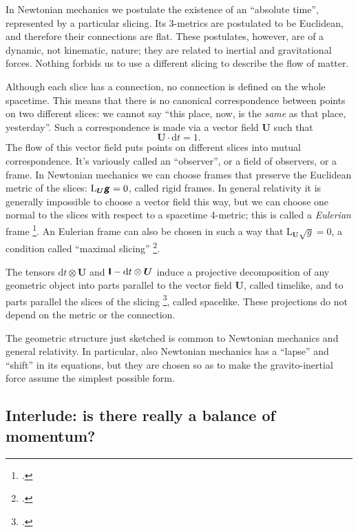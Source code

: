 \documentclass[\ifafour a4paper,12pt,\else a5paper,10pt,\fi%
onecolumn,oneside,article,%
british%
]{memoir}
\theoremstyle{remark}
\theoremstyle{innote}
\newcommand*{\mathte}[1]{\textbf{\textit{\textsf{#1}}}}
\newcommand*{\citep}{\footcites}
\newcommand*{\di}{\mathrm{d}}%
\renewcommand*{\|}[1][]{\nonscript\,#1\vert\nonscript\;\mathopen{}}
\newcommand*{\sect}{\S}%
\newcommand*{\Li}{\mathrm{L}}
\newcommand*{\yrr}{M}
\newcommand*{\yr}{\bm{\yrr}}
\newcommand*{\ycc}{u}
\newcommand*{\yc}{\bm{\ycc}}
\newcommand*{\yFF}{U}
\newcommand*{\yF}{\bm{\yFF}}
\newcommand*{\ygg}{g}
\newcommand*{\yg}{\mathte{\ygg}}
\newcommand*{\ygv}{\sqrt{\ygg}}
\newcommand*{\yI}{\textsf{\textbf{I}}}
\begin{document}
In Newtonian mechanics we postulate the existence of an \enquote{absolute
  time}, represented by a particular slicing. Its 3-metrics are
postulated to be Euclidean, and therefore their connections are flat. These
postulates, however, are of a dynamic, not kinematic, nature; they are
related to inertial and gravitational forces. Nothing forbids us to use a
different slicing to describe the flow of matter.

Although each slice has a connection, no connection is defined on the whole
spacetime. This means that there is no canonical correspondence between
points on two different slices: we cannot say \enquote{this place, now, is
  the \emph{same} as that place, yesterday}. Such a correspondence is made
via a vector field $\yF$ such that
\begin{equation}
  \label{eq:observer_field_unit-time}
  \yF \cdot \di t = 1.
\end{equation}
The flow of this vector field puts points on different slices into mutual
correspondence. It's variously called an \enquote{observer}, or a field of
observers, or a frame. In Newtonian mechanics we can choose frames that
preserve the Euclidean metric of the slices: $\Li_{\yF}\yg = 0$, called
rigid frames. In general relativity it is generally impossible to choose a
vector field this way, but we can choose one normal to the slices with
respect to a spacetime 4-metric; this is called a \emph{Eulerian} frame
\citep{smarretal1978,smarretal1980}. An Eulerian frame can also be chosen in
such a way that $\Li_{\yF}\ygv=0$, a condition called \enquote{maximal
  slicing} \citep[\sect~III.B]{smarretal1978}.

The tensors $\di t\otimes\yF$ and $\yI-\di t\otimes\yF$ induce a projective
decomposition of any geometric object into parts parallel to the vector
field $\yF$, called timelike, and to parts parallel the slices of the
slicing \citep[\sect~B.1.4]{hehletal2003}, called spacelike. These
projections do not depend on the metric or the connection.

The geometric structure just sketched is common to Newtonian mechanics and
general relativity. In particular, also Newtonian mechanics has a
\enquote{lapse} and \enquote{shift} in its equations, but they are chosen
so as to make the gravito-inertial force assume the simplest possible form.

\iffalse
\subsection{Interlude: is there really a balance of momentum?}
\label{sec:really_balance_momentum}
\end{document}
